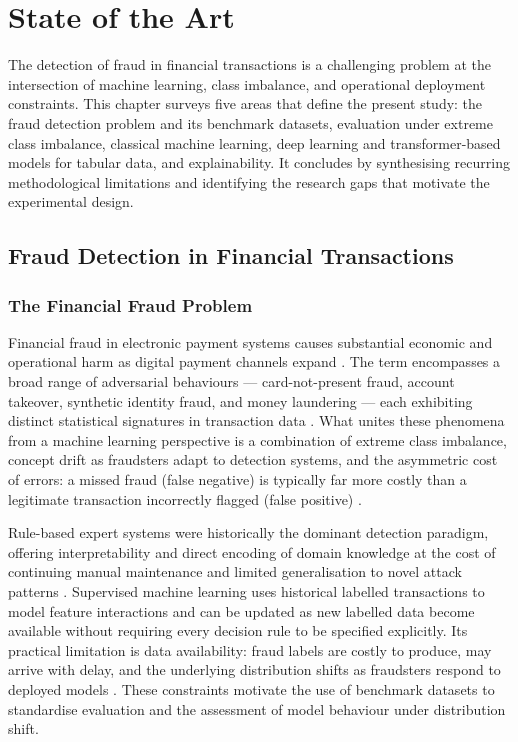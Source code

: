\chapter{State of the Art}
\label{sec:stateoftheart}

The detection of fraud in financial transactions is a challenging problem at the intersection of machine learning, class imbalance, and operational deployment constraints. This chapter surveys five areas that define the present study: the fraud detection problem and its benchmark datasets, evaluation under extreme class imbalance, classical machine learning, deep learning and transformer-based models for tabular data, and explainability. It concludes by synthesising recurring methodological limitations and identifying the research gaps that motivate the experimental design.

\section{Fraud Detection in Financial Transactions}
\label{sec:sota-fraud-detection-financial}

\subsection{The Financial Fraud Problem}
\label{subsec:sota-fraud-nature}

Financial fraud in electronic payment systems causes substantial economic and operational harm as digital payment channels expand \cite{rymantubb2018survey}. The term encompasses a broad range of adversarial behaviours — card-not-present fraud, account takeover, synthetic identity fraud, and money laundering — each exhibiting distinct statistical signatures in transaction data \cite{hilal2022financial}. What unites these phenomena from a machine learning perspective is a combination of extreme class imbalance, concept drift as fraudsters adapt to detection systems, and the asymmetric cost of errors: a missed fraud (false negative) is typically far more costly than a legitimate transaction incorrectly flagged (false positive) \cite{ali2022financial}.

Rule-based expert systems were historically the dominant detection paradigm, offering interpretability and direct encoding of domain knowledge at the cost of continuing manual maintenance and limited generalisation to novel attack patterns \cite{rymantubb2018survey}. Supervised machine learning uses historical labelled transactions to model feature interactions and can be updated as new labelled data become available without requiring every decision rule to be specified explicitly. Its practical limitation is data availability: fraud labels are costly to produce, may arrive with delay, and the underlying distribution shifts as fraudsters respond to deployed models \cite{hernandezaros2024financial}. These constraints motivate the use of benchmark datasets to standardise evaluation and the assessment of model behaviour under distribution shift.

